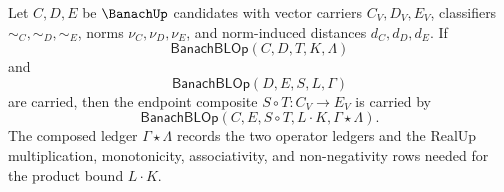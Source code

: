 \begin{theorem}
\label{thm:banach-bounded-linear-operator-composition-closure}
Let $C,D,E$ be $\BanachUp$ candidates with vector carriers $C_V,D_V,E_V$,
classifiers $\sim_C,\sim_D,\sim_E$, norms $\nu_C,\nu_D,\nu_E$, and
norm-induced distances $d_C,d_D,d_E$. If
$$
\mathsf{BanachBLOp}(C,D,T,K,\Lambda)
$$
and
$$
\mathsf{BanachBLOp}(D,E,S,L,\Gamma)
$$
are carried, then the endpoint composite $S\circ T:C_V\to E_V$ is carried by
$$
\mathsf{BanachBLOp}(C,E,S\circ T,L\cdot K,\Gamma\star\Lambda).
$$
The composed ledger $\Gamma\star\Lambda$ records the two operator ledgers and
the RealUp multiplication, monotonicity, associativity, and non-negativity
rows needed for the product bound $L\cdot K$.
\end{theorem}
